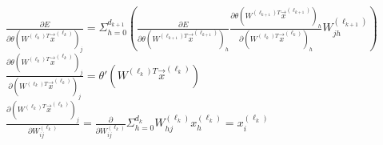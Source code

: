 \documentclass[10pt]{article}
\begin{document}
\noindent
$\frac{\partial E}{\partial \theta(W^{(\ell_k)T}\vec{x}^{(\ell_k)})_j} =
    \Sigma_{h=0}^{d_{k+1}}\left(
        \frac{\partial E}{\partial\theta(W^{(\ell_{k+1})T}\vec{x}^{(\ell_{k+1})})_h}
        \frac{\partial\theta(W^{(\ell_{k+1})T}\vec{x}^{(\ell_{k+1})})_h}{\partial(W^{(\ell_k)T}\vec{x}^{(\ell_k)})_h}
        W_{jh}^{(\ell_{k+1})}
    \right)
$\\

\noindent
$\frac{\partial \theta(W^{(\ell_k)T}\vec{x}^{(\ell_k)})_j}{\partial (W^{(\ell_k)T}\vec{x}^{(\ell_k)})_j} =
    \theta'(W^{(\ell_k)T}\vec{x}^{(\ell_k)})$\\

\noindent
$\frac{\partial (W^{(\ell_k)T}\vec{x}^{(\ell_k)})_j}{\partial W_{ij}^{(\ell_k)}} =
    \frac\partial{\partial W_{ij}^{(\ell_k)}}\Sigma_{h=0}^{d_k}W_{hj}^{(\ell_k)}x_h^{(\ell_k)} = x_i^{(\ell_k)}$\\
\end{document}
